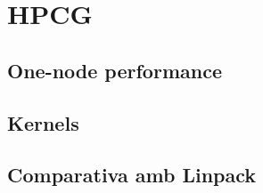 \section{HPCG}
\subsection{One-node performance}


\subsection{Kernels}


\subsection{Comparativa amb Linpack}
